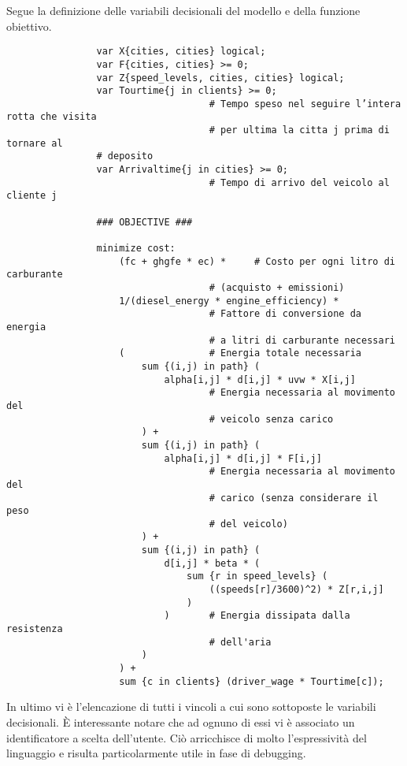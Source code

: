 			Segue la definizione delle variabili decisionali del modello e della funzione obiettivo.

			\begin{verbatim}
				var X{cities, cities} logical;
				var F{cities, cities} >= 0;
				var Z{speed_levels, cities, cities} logical;
				var Tourtime{j in clients} >= 0;	
									# Tempo speso nel seguire l’intera rotta che visita 
									# per ultima la citta j prima di tornare al
				# deposito
				var Arrivaltime{j in cities} >= 0;
									# Tempo di arrivo del veicolo al cliente j
													
				### OBJECTIVE ###

				minimize cost:
					(fc + ghgfe * ec) *		# Costo per ogni litro di carburante
									# (acquisto + emissioni) 
					1/(diesel_energy * engine_efficiency) *
									# Fattore di conversione da energia
									# a litri di carburante necessari
					(				# Energia totale necessaria
						sum {(i,j) in path} (
							alpha[i,j] * d[i,j] * uvw * X[i,j]
									# Energia necessaria al movimento del
									# veicolo senza carico
						) +
						sum {(i,j) in path} (
							alpha[i,j] * d[i,j] * F[i,j]
									# Energia necessaria al movimento del
									# carico (senza considerare il peso 
									# del veicolo)
						) + 
						sum {(i,j) in path} (
							d[i,j] * beta * (
								sum {r in speed_levels} (
									((speeds[r]/3600)^2) * Z[r,i,j] 
								)
							)		# Energia dissipata dalla resistenza 
									# dell'aria
						)
					) + 
					sum {c in clients} (driver_wage * Tourtime[c]);
			\end{verbatim}

			In ultimo vi è l’elencazione di tutti i vincoli a cui sono sottoposte le variabili decisionali. È interessante notare che ad ognuno di essi vi è associato un identificatore a scelta dell’utente. Ciò arricchisce di molto l’espressività del linguaggio e risulta particolarmente utile in fase di debugging.

